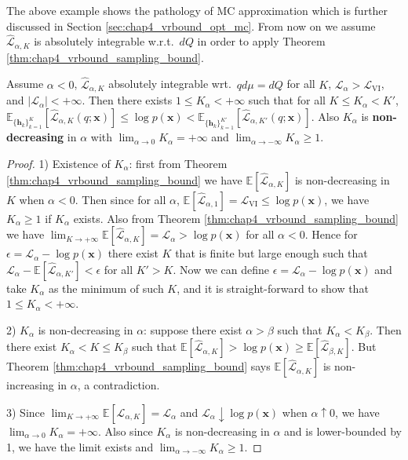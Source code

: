
The above example shows the pathology of MC approximation which is further discussed in Section \ref{sec:chap4_vrbound_opt_mc}. From now on we assume $\hat{\mathcal{L}}_{\alpha, K}$ is absolutely integrable w.r.t.~$dQ$ in order to apply Theorem \ref{thm:chap4_vrbound_sampling_bound}.

 
\begin{lemma}
Assume $\alpha < 0$, $\hat{\mathcal{L}}_{\alpha, K}$ absolutely integrable wrt.~$qd\mu = dQ$ for all $K$, $\mathcal{L}_{\alpha} > \mathcal{L}_{\text{VI}}$, and $|\mathcal{L}_{\alpha}| < +\infty$. Then there exists $1 \leq K_{\alpha} < +\infty$ such that for all $K \leq K_{\alpha} < K'$, $\mathbb{E}_{\{\bm{h}_k\}_{k=1}^K} [ \hat{\mathcal{L}}_{\alpha, K}(q; \bm{x}) ] \leq \log p(\bm{x}) < \mathbb{E}_{\{\bm{h}_k\}_{k=1}^{K'}} [ \hat{\mathcal{L}}_{\alpha, K'}(q; \bm{x}) ]$. Also $K_{\alpha}$ is \textbf{non-decreasing} in $\alpha$ with $\lim_{\alpha \rightarrow 0} K_{\alpha} = + \infty$ and $\lim_{\alpha \rightarrow -\infty} K_{\alpha} \geq 1$.
\label{lemma:chap4_vrbound_alpha_k_existence}
\end{lemma}

\begin{proof}
%
1) Existence of $K_{\alpha}$: first from Theorem \ref{thm:chap4_vrbound_sampling_bound} we have $\mathbb{E}[\hat{\mathcal{L}}_{\alpha, K}]$ is non-decreasing in $K$ when $\alpha < 0$. Then since for all $\alpha$, $\mathbb{E}[\hat{\mathcal{L}}_{\alpha, 1}] = \mathcal{L}_{\text{VI}} \leq \log p(\bm{x})$, we have $K_{\alpha} \geq 1$ if $K_{\alpha}$ exists. Also from Theorem \ref{thm:chap4_vrbound_sampling_bound} we have $\lim_{K \rightarrow +\infty} \mathbb{E}[\hat{\mathcal{L}}_{\alpha, K}] = \mathcal{L}_{\alpha} > \log p(\bm{x})$ for all $\alpha < 0$. Hence for $\epsilon = \mathcal{L}_{\alpha} - \log p(\bm{x})$ there exist $K$ that is finite but large enough such that $\mathcal{L}_{\alpha} - \mathbb{E}[\hat{\mathcal{L}}_{\alpha, K'}] < \epsilon$ for all $K' > K$. Now we can define $\epsilon = \mathcal{L}_{\alpha} - \log p(\bm{x})$ and take $K_{\alpha}$ as the minimum of such $K$, and it is straight-forward to show that $1 \leq K_{\alpha} < +\infty$. 

%
2) $K_{\alpha}$ is non-decreasing in $\alpha$: suppose there exist $\alpha > \beta$ such that $K_{\alpha} < K_{\beta}$. Then there exist $K_{\alpha} < K \leq K_{\beta}$ such that $\mathbb{E}[\hat{\mathcal{L}}_{\alpha, K}] > \log p(\bm{x}) \geq \mathbb{E}[\hat{\mathcal{L}}_{\beta, K}]$. But Theorem \ref{thm:chap4_vrbound_sampling_bound} says $\mathbb{E}[\hat{\mathcal{L}}_{\alpha, K}]$ is non-increasing in $\alpha$, a contradiction. 

%
3) Since $\lim_{K \rightarrow +\infty} \mathbb{E}[\hat{\mathcal{L}}_{\alpha, K}] = \mathcal{L}_{\alpha}$ and $\mathcal{L}_{\alpha} \downarrow \log p(\bm{x})$ when $\alpha \uparrow 0$, we have $\lim_{\alpha \rightarrow 0} K_{\alpha} = +\infty$. Also since $K_{\alpha}$ is non-decreasing in $\alpha$ and is lower-bounded by 1, we have the limit exists and $\lim_{\alpha \rightarrow -\infty} K_{\alpha} \geq 1$.
\end{proof}

